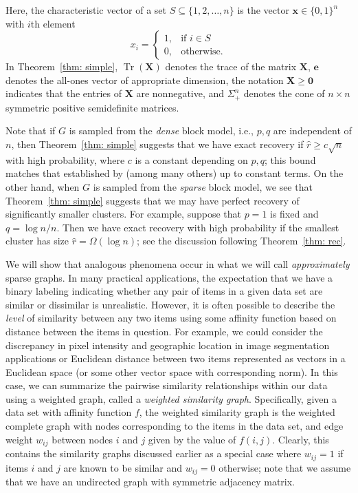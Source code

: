 \documentclass[twoside,11pt]{article}
\newcommand{\R}{\mathbf{R}}
\DeclareMathOperator{\tr}{{Tr}}
\newcommand{\e}{\bs {e}}
\newcommand{\bs}{\boldsymbol}
\newcommand{\x}{\bs {x}}
\newcommand{\X}{\bs {X}}
\newcommand{\0}{\bs{0}}
\newcommand{\branchdef}[1] {\ensuremath{ \left\{\begin{array}{rl} #1 \end{array} \right. }} %
\begin{document}
Here, the characteristic vector of a set 
\(S \subseteq \{1,2,\dots, n\}\) is the vector \( \x \in \{0,1\}^n \) %
with \(i\)th element
\[
x_i = \branchdef{ 1, & \mbox{if } i \in S \\ 0, &\mbox{otherwise.}}
\]
In Theorem~\ref{thm: simple}, \(\tr(\X) \) denotes the trace of the matrix \(\X\),
\(\e\) denotes the all-ones vector of appropriate dimension,
the notation \(\X \ge \0\) indicates that the entries of \(\X\) are nonnegative,
and \(\Sigma_+^n\) denotes the cone of \(n\times n\) symmetric positive semidefinite matrices. 

Note that if \(G\) is sampled from the \emph{dense} block model, i.e., \(p,q\) are independent of \(n\), then Theorem~\ref{thm: simple} suggests that we have exact recovery if \( \hat r \ge c \sqrt{n}\) with high probability, where \(c\) is a constant
depending on \(p, q\); this bound matches that established by \cite{ames2014guaranteed} (among many others) up to
constant terms.
On the other hand, when \(G\) is sampled from the \emph{sparse} block model,
we see that Theorem~\ref{thm: simple} suggests that we may have perfect recovery of significantly smaller clusters.
For example, suppose that \(p=1\) is fixed and \(q = \log n/ n\).
Then we have exact recovery with high probability if 
the smallest cluster has size \(\hat r = \Omega( \log n)\); 
see the discussion following Theorem~\ref{thm: rec}.



We will show that analogous phenomena occur in what we will call
\emph{approximately} sparse graphs.
In many practical applications, the expectation that we have a binary labeling
indicating whether any pair of items in a given data set are similar
or dissimilar is unrealistic. However, it is often possible to 
describe the \emph{level} of similarity between any two items using some affinity 
function based on distance between the items in question.
For example, we could consider the discrepancy in pixel intensity and geographic
location in image segmentation applications or Euclidean distance between
two items represented as vectors in a Euclidean space (or some other vector 
space with corresponding norm).
In this case, we can summarize the pairwise similarity relationships within our
data using
a weighted graph, called a \emph{weighted similarity graph}.
Specifically, given a data set with affinity function \(f\),
the weighted similarity graph is the weighted complete graph with nodes
corresponding to the items in the data set, and edge weight \(w_{ij}\)
between nodes \(i\) and \(j\) given by the value of \(f(i,j)\).
Clearly, this contains the similarity graphs discussed earlier as a
special case where \(w_{ij} = 1\) if items \(i\) and \(j\) are known
to be similar and \(w_{ij} = 0\) otherwise; note that we assume that we have an undirected graph with
symmetric adjacency matrix.
\end{document}
